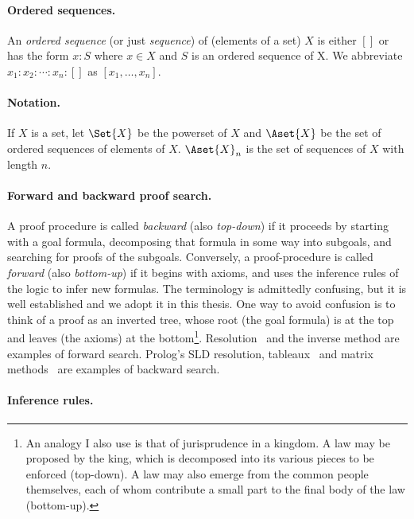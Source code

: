 \paragraph{Ordered sequences.}

An \emph{ordered sequence} (or just \emph{sequence}) of (elements of a set) $X$ is either $[]$
or has the form $x:S$ where $x\in X$ and $S$ is an ordered sequence of X.
We abbreviate $x_1 : x_2 : \cdots : x_n : []$ as $[x_1,\ldots,x_n]$.

\paragraph{Notation.}

If $X$ is a set, let $\Set{X}$ be the powerset of $X$ and $\Aset{X}$ be
the set of ordered sequences of elements of $X$.  $\Aset{X}_n$ is the
set of sequences of $X$ with length $n$.

\paragraph{Forward and backward proof search.}
A proof procedure is called \emph{backward} (also \emph{top-down}) if it
proceeds by starting with a goal formula, decomposing that formula in some way
into subgoals, and searching for proofs of the subgoals.
Conversely, a proof-procedure is called \emph{forward} (also \emph{bottom-up})
if it begins with axioms, and uses the inference rules of the logic to infer new
formulas.  The terminology is admittedly confusing, but it is well established
and we adopt it in this thesis.  One way to avoid confusion is to think of a
proof as an inverted tree, whose root (the goal formula) is at the top and
leaves (the axioms) at the bottom\footnote{An analogy I also use is that of
jurisprudence in a kingdom.  A law may be proposed by the king, which is
decomposed into its various pieces to be enforced (top-down).  A law may also
emerge from the common people themselves, each of whom contribute a small part
to the final body of the law (bottom-up).}.
Resolution~\cite{Robinson.1965.JACM} and the inverse method are examples of forward
search.  Prolog's SLD resolution, tableaux~\cite{Hahnle.2001.Tableaux}
and matrix methods~\cite{Wallen.1990.Book} are examples of backward search.

\paragraph{Inference rules.}


